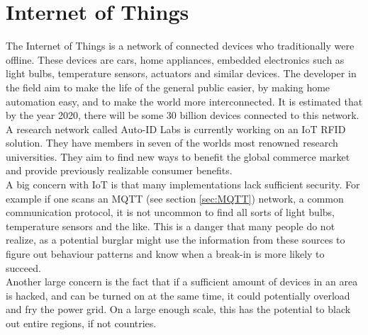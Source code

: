\newpage
\section{Internet of Things}
The Internet of Things is a network of connected devices who traditionally were offline. These devices are cars, home appliances, embedded electronics such as light bulbs, temperature sensors, actuators and similar devices. The developer in the field aim to make the life of the general public easier, by making home automation easy, and to make the world more interconnected. It is estimated that by the year 2020, there will be some 30 billion devices connected to this network. \cite{nordrum2016popular}\\

A research network called Auto-ID Labs is currently working on an IoT RFID solution. They have members in seven of the worlds most renowned research universities. They aim to find new ways to benefit the global commerce market and provide previously realizable consumer benefits.\\

A big concern with IoT is that many implementations lack sufficient security. For example if one scans an MQTT (see section \ref{sec:MQTT}) network, a common communication protocol, it is not uncommon to find all sorts of light bulbs, temperature sensors and the like. This is a danger that many people do not realize, as a potential burglar might use the information from these sources to figure out behaviour patterns and know when a break-in is more likely to succeed.\\

Another large concern is the fact that if a sufficient amount of devices in an area is hacked, and can be turned on at the same time, it could potentially overload and fry the power grid. On a large enough scale, this has the potential to black out entire regions, if not countries.
